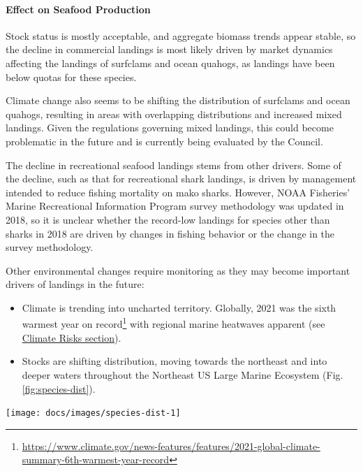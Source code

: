 \documentclass[
  10pt,
]{article}
\providecommand{\tightlist}{%
  \setlength{\itemsep}{0pt}\setlength{\parskip}{0pt}}
\let\origfigure\figure
\let\endorigfigure\endfigure
\renewenvironment{figure}[1][2] {
    \expandafter\origfigure\expandafter[H]
} {
    \endorigfigure
}
\begin{document}
\hypertarget{effect-on-seafood-production}{%
\paragraph{Effect on Seafood
Production}\label{effect-on-seafood-production}}

Stock status is mostly acceptable, and aggregate biomass trends appear
stable, so the decline in commercial landings is most likely driven by
market dynamics affecting the landings of surfclams and ocean quahogs,
as landings have been below quotas for these species.

Climate change also seems to be shifting the distribution of surfclams
and ocean quahogs, resulting in areas with overlapping distributions and
increased mixed landings. Given the regulations governing mixed
landings, this could become problematic in the future and is currently
being evaluated by the Council.

The decline in recreational seafood landings stems from other drivers.
Some of the decline, such as that for recreational shark landings, is
driven by management intended to reduce fishing mortality on mako
sharks. However, NOAA Fisheries' Marine Recreational Information Program
survey methodology was updated in 2018, so it is unclear whether the
record-low landings for species other than sharks in 2018 are driven by
changes in fishing behavior or the change in the survey methodology.

Other environmental changes require monitoring as they may become
important drivers of landings in the future:

\begin{itemize}
\tightlist
\item
  Climate is trending into uncharted territory. Globally, 2021 was the
  sixth warmest year on record\footnote{\url{https://www.climate.gov/news-features/features/2021-global-climate-summary-6th-warmest-year-record}}
  with regional marine heatwaves apparent (see
  \protect\hyperlink{climate-and-ecosystem-productivity}{Climate Risks
  section}).\\
\item
  Stocks are shifting distribution, moving towards the northeast and
  into deeper waters throughout the Northeast US Large Marine Ecosystem
  (Fig. \ref{fig:species-dist}).
\end{itemize}

\begin{figure}

{\centering \texttt{[image: docs/images/species-dist-1]} 

}

\caption{Aggregate species distribution metrics for species in the Northeast Large Marine Ecosystem.}\label{fig:species-dist}
\end{figure}
\end{document}
